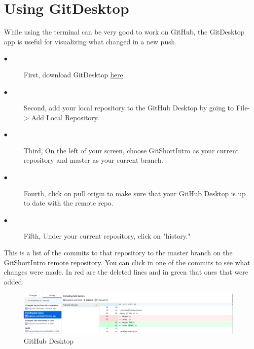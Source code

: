 \documentclass[12pt]{article}
\begin{document}
    \section{Using GitDesktop}
    While using the terminal can be very good to work on GitHub, the GitDesktop app is useful for visualizing what changed in a new push. 
    \begin{description}
    \item[$\bullet$] First, download GitDesktop  \href{https://desktop.github.com/}{here}.
    \item[$\bullet$] Second, add your local repository to the GitHub Desktop by going to File-> Add Local Repository.
    \item[$\bullet$] Third, On the left of your screen, choose GitShortIntro as your current repository and master as your current branch.
    \item[$\bullet$] Fourth, click on pull origin to make sure that your GitHub Desktop is up to date with the remote repo.
    \item[$\bullet$] Fifth, Under your current repository, click on "history."
    \end{description}
    This is a list of the commits to that repository to the master branch on the GitShortIntro remote repository. You can click in one of the commits to see what changes were made. In red are the deleted lines and in green that ones that were added. 
   \vspace{0.2 in}
    \begin{figure}[h]
	\caption{GitHub Desktop}
	\includegraphics[scale=0.5]{figure13}
	\centering
    \end{figure} 
    
\end{document}
